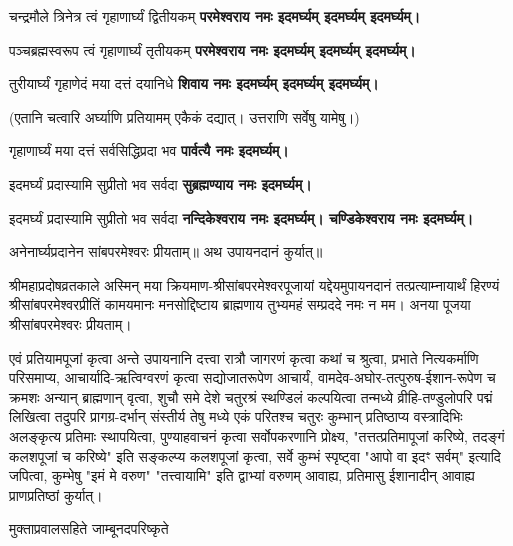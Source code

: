 {चन्द्रमौले त्रिनेत्र त्वं गृहाणार्घ्यं द्वितीयकम्}
\textbf{परमेश्वराय नमः इदमर्घ्यम् इदमर्घ्यम् इदमर्घ्यम्।}

{पञ्चब्रह्मस्वरूप त्वं गृहाणार्घ्यं तृतीयकम्}
\textbf{परमेश्वराय नमः इदमर्घ्यम् इदमर्घ्यम् इदमर्घ्यम्।}

{तुरीयार्घ्यं गृहाणेदं मया दत्तं दयानिधे}
\textbf{शिवाय नमः इदमर्घ्यम् इदमर्घ्यम् इदमर्घ्यम्।}

(एतानि चत्वारि अर्घ्याणि प्रतियामम् एकैकं दद्यात्। उत्तराणि सर्वेषु यामेषु।)

{गृहाणार्घ्यं मया दत्तं सर्वसिद्धिप्रदा भव}
\textbf{पार्वत्यै नमः इदमर्घ्यम्।}

{इदमर्घ्यं प्रदास्यामि सुप्रीतो भव सर्वदा}
\textbf{सुब्रह्मण्याय नमः इदमर्घ्यम्।}

{इदमर्घ्यं प्रदास्यामि सुप्रीतो भव सर्वदा}
\textbf{नन्दिकेश्वराय नमः इदमर्घ्यम्। चण्डिकेश्वराय नमः इदमर्घ्यम्।}

अनेनार्घ्यप्रदानेन सांबपरमेश्वरः प्रीयताम्॥ अथ उपायनदानं कुर्यात्॥

\hiranyagarbha

श्रीमहाप्रदोषव्रतकाले अस्मिन् मया क्रियमाण-श्रीसांबपरमेश्वरपूजायां
यद्देयमुपायनदानं तत्प्रत्याम्नायार्थं हिरण्यं श्रीसांबपरमेश्वरप्रीतिं
कामयमानः मनसोद्दिष्टाय ब्राह्मणाय तुभ्यमहं सम्प्रददे नमः न मम।
अनया पूजया श्रीसांबपरमेश्वरः प्रीयताम्।


एवं प्रतियामपूजां कृत्वा अन्ते उपायनानि दत्त्वा रात्रौ जागरणं कृत्वा कथां च श्रुत्वा,
प्रभाते नित्यकर्माणि परिसमाप्य, आचार्यादि-ऋत्विग्वरणं कृत्वा सद्योजातरूपेण आचार्यं,
वामदेव-अघोर-तत्पुरुष-ईशान-रूपेण च क्रमशः अन्यान् ब्राह्मणान् वृत्वा, शुचौ समे देशे
चतुरश्रं स्थण्डिलं कल्पयित्वा तन्मध्ये व्रीहि-तण्डुलोपरि पद्मं लिखित्वा तदुपरि प्रागग्र-दर्भान्
संस्तीर्य तेषु मध्ये एकं परितश्च चतुरः कुम्भान् प्रतिष्ठाप्य वस्त्रादिभिः अलङ्कृत्य
प्रतिमाः स्थापयित्वा, पुण्याहवाचनं कृत्वा सर्वोपकरणानि प्रोक्ष्य, "तत्तत्प्रतिमापूजां करिष्ये,
तदङ्गं कलशपूजां च करिष्ये" इति सङ्कल्प्य कलशपूजां कृत्वा, सर्वे कुम्भं स्पृष्ट्वा
"आपो वा इदꣳ सर्वम्" इत्यादि जपित्वा, कुम्भेषु "इमं मे वरुण" "तत्त्वायामि" इति द्वाभ्यां
वरुणम् आवाह्य, प्रतिमासु ईशानादीन् आवाह्य प्राणप्रतिष्ठां कुर्यात्।

{मुक्ताप्रवालसहिते जाम्बूनदपरिष्कृते}

